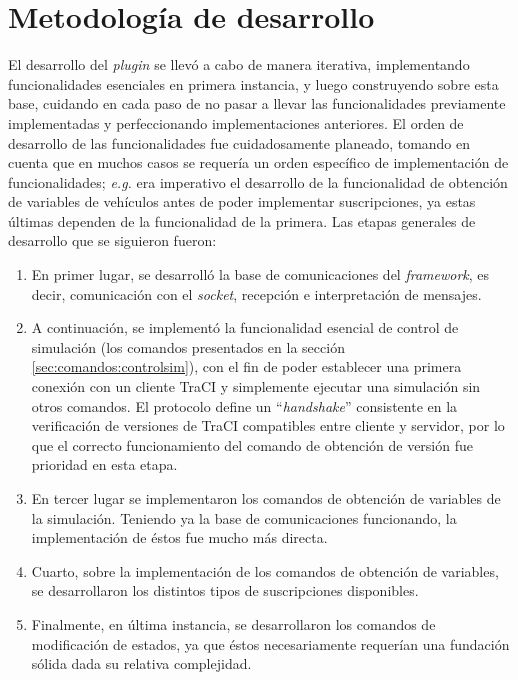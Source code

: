 \section{Metodología de desarrollo} \label{sec:metodologia}

El desarrollo del \emph{plugin} se llevó a cabo de manera iterativa, implementando funcionalidades esenciales en primera instancia, y luego construyendo sobre esta base, cuidando en cada paso de no pasar a llevar las funcionalidades previamente implementadas y perfeccionando implementaciones anteriores. El orden de desarrollo de las funcionalidades fue cuidadosamente planeado, tomando en cuenta que en muchos casos se requería un orden específico de implementación de funcionalidades; \emph{e.g.} era imperativo el desarrollo de la funcionalidad de obtención de variables de vehículos antes de poder implementar suscripciones, ya estas últimas dependen de la funcionalidad de la primera. Las etapas generales de desarrollo que se siguieron fueron:

\begin{enumerate}
    \item En primer lugar, se desarrolló la base de comunicaciones del \emph{framework}, es decir, comunicación con el \emph{socket}, recepción e interpretación de mensajes. 
    
    \item A continuación, se implementó la funcionalidad esencial de control de simulación (los comandos presentados en la sección \ref{sec:comandos:controlsim}), con el fin de poder establecer una primera conexión con un cliente TraCI y simplemente ejecutar una simulación sin otros comandos. 
    El protocolo define un ``\emph{handshake}'' consistente en la verificación de versiones de TraCI compatibles entre cliente y servidor, por lo que el correcto funcionamiento del comando de obtención de versión fue prioridad en esta etapa.
    
    \item En tercer lugar se implementaron los comandos de obtención de variables de la simulación. Teniendo ya la base de comunicaciones funcionando, la implementación de éstos fue mucho más directa.
    
    \item Cuarto, sobre la implementación de los comandos de obtención de variables, se desarrollaron los distintos tipos de suscripciones disponibles.
    
    \item Finalmente, en última instancia, se desarrollaron los comandos de modificación de estados, ya que éstos necesariamente requerían una fundación sólida dada su relativa complejidad.
\end{enumerate}

